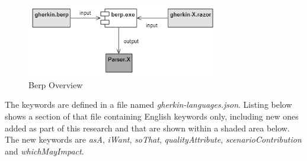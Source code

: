 \documentclass[dissertation,final]{softeng}
\begin{document}
\begin{figure}[h!]
\includegraphics[width=0.75\textwidth]{berp_overview}
\centering
\caption[Berp Overview]{Berp Overview~\footnotemark}
\label{fig:berp_overview}
\end{figure}

The keywords are defined in a file named \emph{gherkin-languages.json}. Listing below shows a section of that file containing English keywords only, including new ones added as part of this research and that are shown within a shaded area below. The new keywords are \emph{asA}, \emph{iWant}, \emph{soThat}, \emph{qualityAttribute}, \emph{scenarioContribution} and \emph{whichMayImpact}. 

\end{document}
